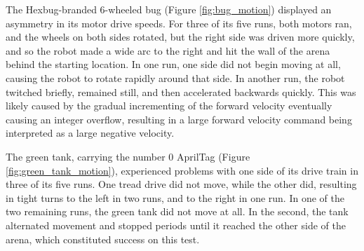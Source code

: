 The Hexbug-branded 6-wheeled bug (Figure \ref{fig:bug_motion}) displayed an asymmetry in its motor drive speeds. 
For three of its five runs, both motors ran, and the wheels on both sides rotated, but the right side was driven more quickly, and so the robot made a wide arc to the right and hit the wall of the arena behind the starting location. 
In one run, one side did not begin moving at all, causing the robot to rotate rapidly around that side. 
In another run, the robot twitched briefly, remained still, and then accelerated backwards quickly. 
This was likely caused by the gradual incrementing of the forward velocity eventually causing an integer overflow, resulting in a large forward velocity command being interpreted as a large negative velocity.

The green tank, carrying the number 0 AprilTag (Figure \ref{fig:green_tank_motion}), experienced problems with one side of its drive train in three of its five runs.
One tread drive did not move, while the other did, resulting in tight turns to the left in two runs, and to the right in one run. In one of the two remaining runs, the green tank did not move at all. In the second, the tank alternated movement and stopped periods until it reached the other side of the arena, which constituted success on this test. 

